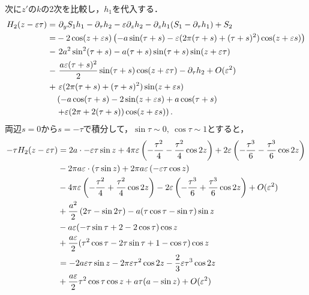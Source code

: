 \documentclass[../main]{subfiles}
\begin{document}
    次に$z'$の$k$の2次を比較し，$h_1$を代入する．
    \begin{align}
        \begin{split}
            H_2(z-\varepsilon \tau)=&\ \partial_y S_1h_1 -\partial_\tau h_2-\varepsilon\partial_zh_2 -\partial_zh_1(S_1-\partial_\tau h_1)+S_2\\
            =&-2\cos (z+\varepsilon s)\left( -a\sin(\tau+s)-\varepsilon(2\pi (\tau+s)+(\tau+s)^2) \cos (z+\varepsilon s) \right)\\
            -&\ 2a^2\sin^2(\tau+s)-a(\tau+s)\sin (\tau+s)\sin (z+\varepsilon\tau)\\
            -&\ \frac{a\varepsilon (\tau+s)^2}{2}\sin (\tau+s) \cos (z+\varepsilon\tau)-\partial_\tau h_2+O(\varepsilon^2)\\
            +&\ \varepsilon(2\pi(\tau+s)+(\tau+s)^2)\sin (z+\varepsilon s) \\
            &\left( -a\cos(\tau+s)-2\sin (z+\varepsilon s) +a\cos(\tau+s)\right.\\
            &\left.+\varepsilon(2\pi +2(\tau+s))\cos (z+\varepsilon s)\right).
        \end{split}
    \end{align}
    両辺$s=0$から$s=-\tau$で積分して，$\sin\tau\sim 0,\ \cos\tau\sim 1$とすると，
    \begin{align}
        -\tau H_2(z-\varepsilon \tau)&=2a\cdot -\varepsilon \tau\sin z+4\pi\varepsilon\left( -\frac{\tau^2}{4} -\frac{\tau^2}{4}\cos 2z\right)+2\varepsilon\left( -\frac{\tau^3}{6} -\frac{\tau^3}{6}\cos 2 z\right)\notag\\
        &-2\pi a\varepsilon\cdot\left(\tau\sin z\right)+2\pi a\varepsilon\left(-\varepsilon \tau\cos z\right)\notag\\
        &-4\pi\varepsilon\left(-\frac{\tau^2}{4}+\frac{\tau^2}{4}\cos 2 z\right)-2\varepsilon\left( -\frac{\tau^3}{6} +\frac{\tau^3}{6}\cos 2z\right)+O(\varepsilon^2)\notag\\
        &+\frac{a^2}{2}\left( 2\tau-\sin 2\tau\right)-a(\tau\cos\tau-\sin\tau)\sin z\notag\\
        &-a\varepsilon(-\tau\sin\tau+2-2\cos\tau)\cos z \notag\\
        &+\frac{a\varepsilon}{2}(\tau^2\cos\tau-2\tau\sin\tau+1-\cos\tau)\cos z\notag\\
        &=-2a\varepsilon \tau\sin z-2\pi\varepsilon\tau^2\cos 2 z-\frac{2}{3}\varepsilon\tau^3\cos 2z\notag\\
        &+\frac{a\varepsilon}{2}\tau^2\cos\tau\cos z+a\tau(a-\sin z)+O(\varepsilon^2)
    \end{align}
\end{document}
